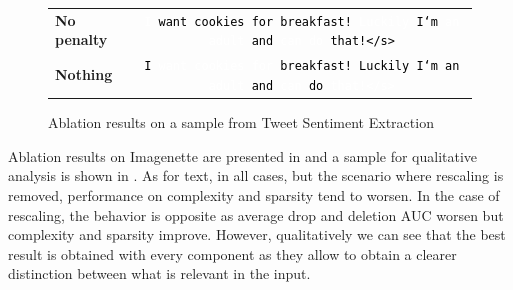 \begin{figure}[t!]
{\begin{tabular}{lc}
    \textbf{No penalty} & {\tt\colorbox[RGB]{127, 0, 0}{\textcolor{white}{\vphantom{Tg}I}} \colorbox[RGB]{255, 247, 236}{\textcolor{black}{\vphantom{Tg}want}} \colorbox[RGB]{255, 247, 236}{\textcolor{black}{\vphantom{Tg}cookies}} \colorbox[RGB]{255, 247, 236}{\textcolor{black}{\vphantom{Tg}for}} \colorbox[RGB]{255, 247, 236}{\textcolor{black}{\vphantom{Tg}breakfast!}} \colorbox[RGB]{127, 0, 0}{\textcolor{white}{\vphantom{Tg}Luckily}} \colorbox[RGB]{231, 83, 58}{\textcolor{black}{\vphantom{Tg}I`m}} \colorbox[RGB]{127, 0, 0}{\textcolor{white}{\vphantom{Tg}an}} \colorbox[RGB]{127, 0, 0}{\textcolor{white}{\vphantom{Tg}adult}} \colorbox[RGB]{255, 247, 236}{\textcolor{black}{\vphantom{Tg}and}} \colorbox[RGB]{127, 0, 0}{\textcolor{white}{\vphantom{Tg}can}} \colorbox[RGB]{127, 0, 0}{\textcolor{white}{\vphantom{Tg}do}} \colorbox[RGB]{231, 83, 58}{\textcolor{black}{\vphantom{Tg}that!</s>}}}\\
    \textbf{Nothing} & {\tt\colorbox[RGB]{224, 68, 47}{\textcolor{black}{\vphantom{Tg}I}} \colorbox[RGB]{178, 0, 0}{\textcolor{white}{\vphantom{Tg}want}} \colorbox[RGB]{180, 2, 1}{\textcolor{white}{\vphantom{Tg}cookies}} \colorbox[RGB]{189, 14, 9}{\textcolor{white}{\vphantom{Tg}for}} \colorbox[RGB]{219, 57, 38}{\textcolor{black}{\vphantom{Tg}breakfast!}} \colorbox[RGB]{252, 142, 90}{\textcolor{black}{\vphantom{Tg}Luckily}} \colorbox[RGB]{227, 75, 52}{\textcolor{black}{\vphantom{Tg}I`m}} \colorbox[RGB]{226, 73, 51}{\textcolor{black}{\vphantom{Tg}an}} \colorbox[RGB]{211, 42, 27}{\textcolor{white}{\vphantom{Tg}adult}} \colorbox[RGB]{236, 95, 67}{\textcolor{black}{\vphantom{Tg}and}} \colorbox[RGB]{193, 18, 12}{\textcolor{white}{\vphantom{Tg}can}} \colorbox[RGB]{224, 68, 47}{\textcolor{black}{\vphantom{Tg}do}} \colorbox[RGB]{210, 41, 26}{\textcolor{white}{\vphantom{Tg}that!</s>}}}\\
    \end{tabular}
    }
    \caption{Ablation results on a sample from Tweet Sentiment Extraction} \label{fig:tweet_ablation}
\end{figure}


Ablation results on Imagenette are presented in  and a sample for qualitative analysis is shown in . As for text, in all cases, but the scenario where rescaling is removed, performance on complexity and sparsity tend to worsen. In the case of rescaling, the behavior is opposite as average drop and deletion AUC worsen but complexity and sparsity improve. However, qualitatively we can see that the best result is obtained with every component as they allow to obtain a clearer distinction between what is relevant in the input.

